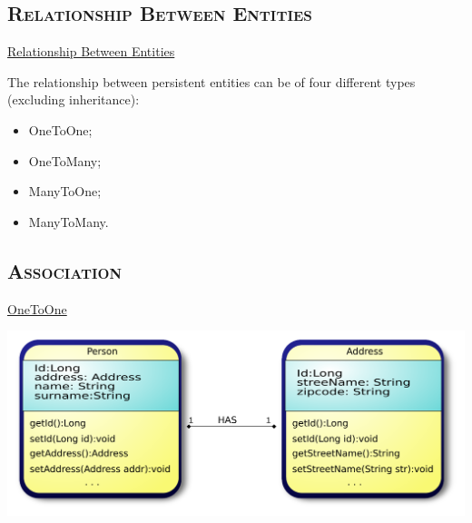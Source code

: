 \documentclass[xcolor=x11names,compress]{beamer}
\renewcommand{\(}{\begin{columns}}
\renewcommand{\)}{\end{columns}}
\newcommand{\<}[1]{\begin{column}{#1}}
\renewcommand{\>}{\end{column}}
\begin{document}
\subsection{\scshape Relationship Between Entities}
\begin{frame}{\underline{Relationship Between Entities}}
\justifying

The relationship between persistent entities can be of four different types (excluding inheritance):

\begin{itemize}
\itemsep 12pt
\justifying

\item OneToOne;
\item OneToMany;
\item ManyToOne;
\item ManyToMany.

\end{itemize}

\end{frame}

\subsection{\scshape Association}
\begin{frame}{\underline{OneToOne}}
\justifying

\begin{center}

\includegraphics[keepaspectratio, width=\textwidth]{oneToOne}

\end{center}

\end{frame}
\end{document}
